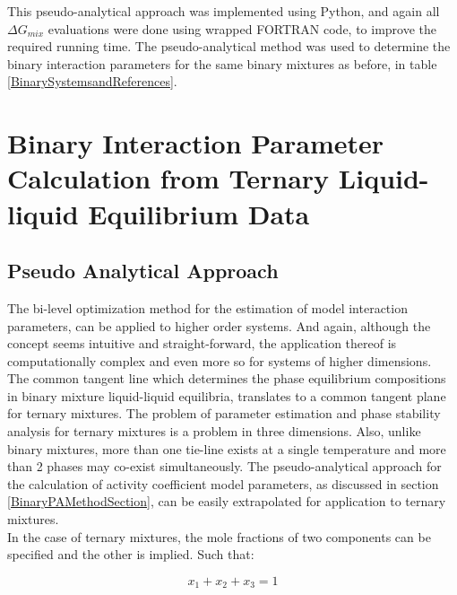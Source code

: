 This pseudo-analytical approach was implemented using Python, and again all $\Delta G_{mix}$ evaluations were done using wrapped FORTRAN code, to improve the required running time. The pseudo-analytical method was used to determine the binary interaction parameters for the same binary mixtures as before, in table \ref{BinarySystemsandReferences}.\\				

\section{Binary Interaction Parameter Calculation from Ternary Liquid-liquid Equilibrium Data}

\subsection{Pseudo Analytical Approach}\label{TernaryPAMethodSection}

The bi-level optimization method for the estimation of model interaction parameters, can be applied to higher order systems. And again, although the concept seems intuitive and straight-forward, the application thereof is computationally complex and even more so for systems of higher dimensions.\\

The common tangent line which determines the phase equilibrium compositions in binary mixture liquid-liquid equilibria, translates to a common tangent plane for ternary mixtures. The problem of parameter estimation and phase stability analysis for ternary mixtures is a problem in three dimensions. Also, unlike binary mixtures, more than one tie-line exists at a single temperature and more than 2 phases may co-exist simultaneously. The pseudo-analytical approach for the calculation of activity coefficient model parameters, as discussed in section \ref{BinaryPAMethodSection}, can be easily extrapolated for application to ternary mixtures.\\

In the case of ternary mixtures, the mole fractions of two components can be specified and the other is implied. Such that:\

\begin{equation}
x_{1} + x_{2} + x_{3} = 1
\end{equation}\

